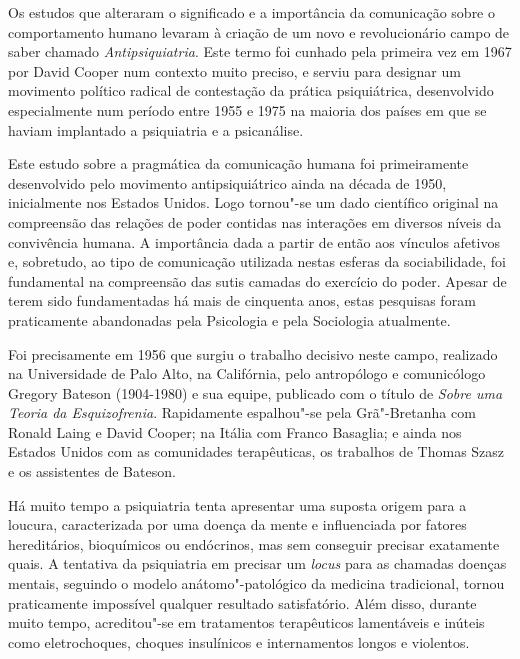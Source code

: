 Os estudos que alteraram o significado e a importância da comunicação
sobre o comportamento humano levaram à criação de um novo e
revolucionário campo de saber chamado \emph{Antipsiquiatria}. Este termo
foi cunhado pela primeira vez em 1967 por David Cooper num contexto
muito preciso, e serviu para designar um movimento político radical de
contestação da prática psiquiátrica, desenvolvido especialmente num
período entre 1955 e 1975 na maioria dos países em que se haviam
implantado a psiquiatria e a psicanálise.

Este estudo sobre a pragmática da comunicação humana foi primeiramente
desenvolvido pelo movimento antipsiquiátrico ainda na década de 1950,
inicialmente nos Estados Unidos. Logo tornou"-se um dado científico
original na compreensão das relações de poder contidas nas interações em
diversos níveis da convivência humana. A importância dada a partir de
então aos vínculos afetivos e, sobretudo, ao tipo de comunicação utilizada
nestas esferas da sociabilidade, foi fundamental na compreensão das sutis
camadas do exercício do poder. Apesar de terem sido fundamentadas há
mais de cinquenta anos, estas pesquisas foram praticamente abandonadas
pela Psicologia e pela Sociologia atualmente.

Foi precisamente em 1956 que surgiu o trabalho decisivo neste campo,
realizado na Universidade de Palo Alto, na Califórnia, pelo antropólogo
e comunicólogo Gregory Bateson (1904-1980) e sua equipe, publicado com o
título de \emph{Sobre uma Teoria da Esquizofrenia}. Rapidamente
espalhou"-se pela Grã"-Bretanha com Ronald Laing e David Cooper; na
Itália com Franco Basaglia; e ainda nos Estados Unidos com as
comunidades terapêuticas, os trabalhos de Thomas Szasz e os assistentes
de Bateson.

Há muito tempo a psiquiatria tenta apresentar uma suposta origem para a
loucura, caracterizada por uma doença da mente e influenciada por
fatores hereditários, bioquímicos ou endócrinos, mas sem conseguir
precisar exatamente quais. A tentativa da psiquiatria em precisar um
\emph{locus} para as chamadas doenças mentais, seguindo o modelo
anátomo"-patológico da medicina tradicional, tornou praticamente
impossível qualquer resultado satisfatório. Além disso, durante muito
tempo, acreditou"-se em tratamentos terapêuticos lamentáveis e inúteis
como eletrochoques, choques insulínicos e internamentos longos e
violentos.

